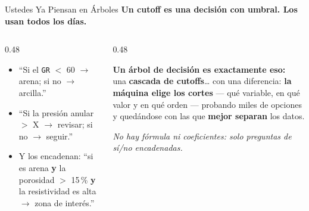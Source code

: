 \documentclass[aspectratio=169, 11pt]{beamer}
\begin{document}
\begin{frame}{Ustedes Ya Piensan en Árboles}
  \vspace{-6pt}
  {\small\color{arcaDark}\bfseries
    Un cutoff es una decisión con umbral. Los usan todos los días.}

  \vspace{8pt}
  \begin{columns}[T]
    \begin{column}{0.48\textwidth}
      {\footnotesize\color{textMuted}
      \begin{itemize}\setlength{\itemsep}{7pt}
        \item[{\color{arcaRed}\scriptsize\faCodeBranch}]
          ``Si el \texttt{GR} \(<\) 60 \(\to\) arena; si no \(\to\) arcilla.''
        \item[{\color{arcaRed}\scriptsize\faCodeBranch}]
          ``Si la presión anular \(>\) X \(\to\) revisar; si no \(\to\) seguir.''
        \item[{\color{arcaRed}\scriptsize\faCodeBranch}]
          Y los encadenan: ``si es arena \textbf{y} la porosidad
          \(>\) 15\,\% \textbf{y} la resistividad es alta \(\to\) zona de interés.''
      \end{itemize}
      }
    \end{column}
    \begin{column}{0.48\textwidth}
      \begin{tcolorbox}[colback=arcaGray, colframe=arcaRed, boxrule=0pt, leftrule=3pt,
        arc=3pt, left=6pt, right=6pt, top=5pt, bottom=5pt]
        {\scriptsize\color{arcaDark}\bfseries Un árbol de decisión es exactamente eso:}\\[4pt]
        {\scriptsize\color{textMuted}
          una \textbf{cascada de cutoffs}\ldots{} con una diferencia:
          \textbf{la máquina elige los cortes} --- qué variable,
          en qué valor y en qué orden --- probando miles de
          opciones y quedándose con las que \textbf{mejor separan}
          los datos.}
      \end{tcolorbox}
      \vspace{5pt}
      {\scriptsize\color{textMuted}\itshape
        No hay fórmula ni coeficientes: solo preguntas
        de sí/no encadenadas.}
    \end{column}
  \end{columns}
\end{frame}
\end{document}
